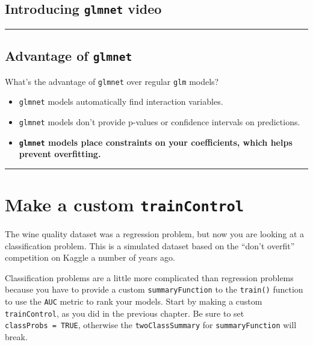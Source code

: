 \documentclass[]{book}
\begin{document}
\subsection*{\texorpdfstring{Introducing \texttt{glmnet}
video}{Introducing glmnet video}}\label{introducing-glmnet-video}

\begin{center}\rule{0.5\linewidth}{\linethickness}\end{center}

\subsection*{\texorpdfstring{Advantage of
\texttt{glmnet}}{Advantage of glmnet}}\label{advantage-of-glmnet}

What's the advantage of \texttt{glmnet} over regular \texttt{glm}
models?

\begin{itemize}
\item
  \texttt{glmnet} models automatically find interaction variables.
\item
  \texttt{glmnet} models don't provide p-values or confidence intervals
  on predictions.
\item
  \textbf{\texttt{glmnet} models place constraints on your coefficients,
  which helps prevent overfitting.}
\end{itemize}

\begin{center}\rule{0.5\linewidth}{\linethickness}\end{center}

\section{\texorpdfstring{Make a custom
\texttt{trainControl}}{Make a custom trainControl}}\label{make-a-custom-traincontrol}

The wine quality dataset was a regression problem, but now you are
looking at a classification problem. This is a simulated dataset based
on the ``don't overfit'' competition on Kaggle a number of years ago.

Classification problems are a little more complicated than regression
problems because you have to provide a custom \texttt{summaryFunction}
to the \texttt{train()} function to use the \texttt{AUC} metric to rank
your models. Start by making a custom \texttt{trainControl}, as you did
in the previous chapter. Be sure to set \texttt{classProbs\ =\ TRUE},
otherwise the \texttt{twoClassSummary} for \texttt{summaryFunction} will
break.
\end{document}
